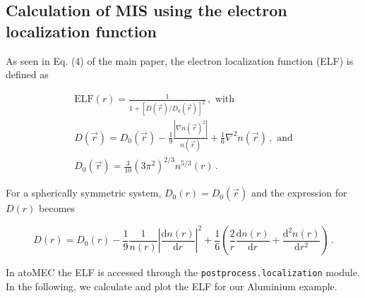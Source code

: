 \documentclass[preprint,aps]{revtex4-2}
\begin{document}
    \hypertarget{calculation-of-mis-using-the-electron-localization-function}{%
\subsection{Calculation of MIS using the electron localization
function}\label{calculation-of-mis-using-the-electron-localization-function}}

As seen in Eq. (4) of the main paper, the electron localization function
(ELF) is defined as

\begin{gather}
\textrm{ELF}(r) = \frac{1}{1+[D(\vec{r})/D_0(\vec{r})]^2}\,,\textrm{ with} \\
D(\vec{r}) = D_0(\vec{r}) - \frac{1}{9} \frac{|\nabla n(\vec{r})^2|}{n(\vec{r})} + \frac{1}{6}\nabla^2 n(\vec{r})\,, \textrm{ and} \\
D_0(\vec{r}) = \frac{3}{10}(3\pi^2)^{2/3} n^{5/3}(r)\,.
\end{gather}

For a spherically symmetric system, \(D_0(r)=D_0(\vec{r})\) and the
expression for \(D(r)\) becomes

\begin{equation}
D(r) = D_0(r) - \frac{1}{9} \frac{1}{n(r)} \left| \frac{\textrm{d}n(r)}{\textrm{d}r}\right|^2 + \frac{1}{6} \left(  \frac{2}{r} \frac{\textrm{d}n(r)}{\textrm{d}r} +  \frac{\textrm{d}^2 n(r)}{\textrm{d}r^2}\right)\,.
\end{equation}

In atoMEC the ELF is accessed through the
\texttt{postprocess.localization} module. In the following, we calculate
and plot the ELF for our Aluminium example.
\end{document}
